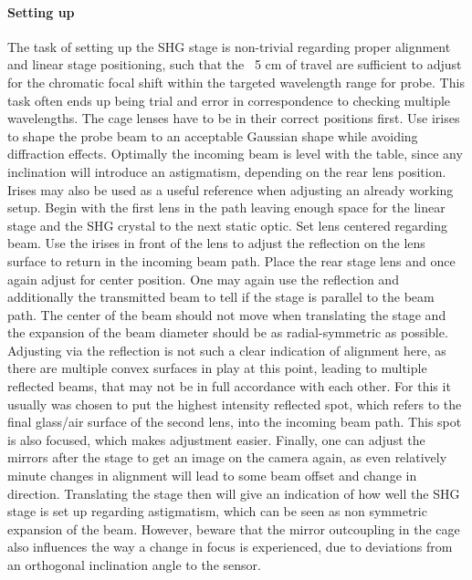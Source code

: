 \documentclass[twoside,openright,listof=numbered]{scrreprt}
\begin{document}
\paragraph{Setting up}
The task of setting up the SHG stage is non-trivial regarding proper alignment and linear stage positioning, such that the ~5 cm of travel are sufficient to adjust for the chromatic focal shift within the targeted wavelength range for probe. This task often ends up being trial and error in correspondence to checking multiple wavelengths. The cage lenses have to be in their correct positions first.\newline
Use irises to shape the probe beam to an acceptable Gaussian shape while avoiding diffraction effects. Optimally the incoming beam is level with the table, since any inclination will introduce an astigmatism, depending on the rear lens position. Irises may also be used as a useful reference when adjusting an already working setup.\newline
Begin with the first lens in the path leaving enough space for the linear stage and the SHG crystal to the next static optic. Set lens centered regarding beam. Use the irises in front of the lens to adjust the reflection on the lens surface to return in the incoming beam path.\newline
Place the rear stage lens and once again adjust for center position. One may again use the reflection and additionally the transmitted beam to tell if the stage is parallel to the beam path. The center of the beam should not move when translating the stage and the expansion of the beam diameter should be as radial-symmetric as possible. Adjusting via the reflection is not such a clear indication of alignment here, as there are multiple convex surfaces in play at this point, leading to multiple reflected beams, that may not be in full accordance with each other. For this it usually was chosen to put the highest intensity reflected spot, which refers to the final glass/air surface of the second lens, into the incoming beam path. This spot is also focused, which makes adjustment easier.\newline
Finally, one can adjust the mirrors after the stage to get an image on the camera again, as even relatively minute changes in alignment will lead to some beam offset and change in direction. Translating the stage then will give an indication of how well the SHG stage is set up regarding astigmatism, which can be seen as non symmetric expansion of the beam. However, beware that the mirror outcoupling in the cage also influences the way a change in focus is experienced, due to deviations from an orthogonal inclination angle to the sensor.
\end{document}
